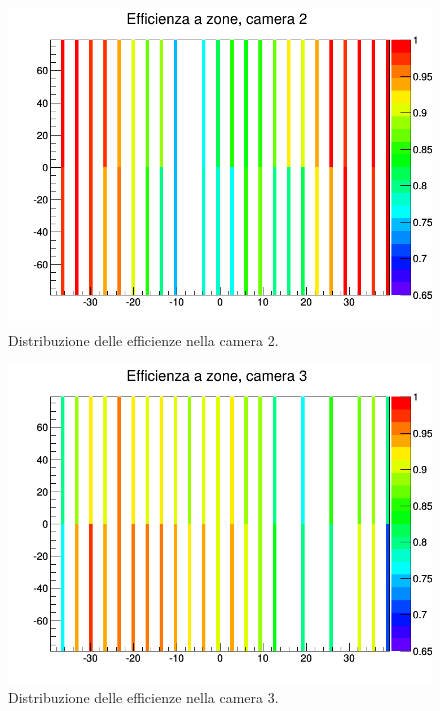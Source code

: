 \documentclass[8pt]{extarticle}
\begin{document}
\begin{figure}
\begin{center}
\includegraphics[scale=0.3]{eff_zone2}
\caption{Distribuzione delle efficienze nella camera 2.}
\label{fig:eff_zone2}
\end{center}
\end{figure}

\begin{figure}
\begin{center}
\includegraphics[scale=0.3]{eff_zone3}
\caption{Distribuzione delle efficienze nella camera 3.}
\label{fig:eff_zone3}
\end{center}
\end{figure}
\end{document}
